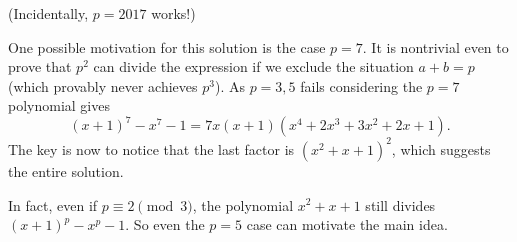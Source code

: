 \documentclass[11pt]{scrartcl}
\begin{document}
(Incidentally, $p = 2017$ works!)

\begin{remark*}
One possible motivation for this solution is the case $p = 7$.
It is nontrivial even to prove that $p^2$ can divide the expression
if we exclude the situation $a+b=p$ (which provably never achieves $p^3$).
As $p = 3, 5$ fails considering the $p = 7$ polynomial gives
\[ (x+1)^7 - x^7 - 1 = 7x(x+1) \left( x^4 + 2x^3 + 3x^2 + 2x + 1 \right). \]
The key is now to notice that the last factor is $(x^2+x+1)^2$,
which suggests the entire solution.

In fact, even if $p \equiv 2 \pmod 3$,
the polynomial $x^2+x+1$ still divides $(x+1)^p-x^p-1$.
So even the $p = 5$ case can motivate the main idea.
\end{remark*}
\pagebreak
\end{document}
